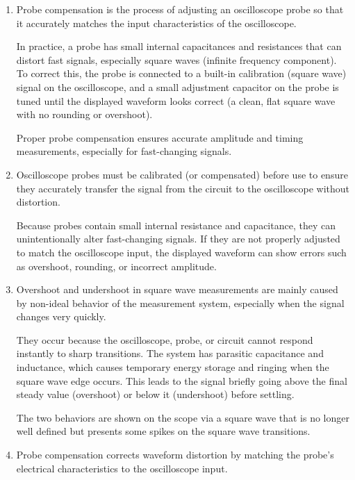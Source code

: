\documentclass[../main.tex]{subfiles}
\begin{document}
\begin{enumerate}[label=\textbf{\arabic*.}]
	This stability is essential for accurate waveform analysis because it allows you to clearly observe signal shape, timing, and amplitude. It also makes it possible to reliably measure features like period, frequency, and rise time without the display constantly shifting.

	\item Probe compensation is the process of adjusting an oscilloscope probe so that it accurately matches the input characteristics of the oscilloscope.

	In practice, a probe has small internal capacitances and resistances that can distort fast signals, especially square waves (infinite frequency component). To correct this, the probe is connected to a built-in calibration (square wave) signal on the oscilloscope, and a small adjustment capacitor on the probe is tuned until the displayed waveform looks correct (a clean, flat square wave with no rounding or overshoot).

	Proper probe compensation ensures accurate amplitude and timing measurements, especially for fast-changing signals.

	\item Oscilloscope probes must be calibrated (or compensated) before use to ensure they accurately transfer the signal from the circuit to the oscilloscope without distortion.

	Because probes contain small internal resistance and capacitance, they can unintentionally alter fast-changing signals. If they are not properly adjusted to match the oscilloscope input, the displayed waveform can show errors such as overshoot, rounding, or incorrect amplitude.
	
	\item Overshoot and undershoot in square wave measurements are mainly caused by non-ideal behavior of the measurement system, especially when the signal changes very quickly.

	They occur because the oscilloscope, probe, or circuit cannot respond instantly to sharp transitions. The system has parasitic capacitance and inductance, which causes temporary energy storage and ringing when the square wave edge occurs. This leads to the signal briefly going above the final steady value (overshoot) or below it (undershoot) before settling.

	The two behaviors are shown on the scope via a square wave that is no longer well defined but presents some spikes on the square wave transitions.

	\item Probe compensation corrects waveform distortion by matching the probe’s electrical characteristics to the oscilloscope input.


\end{enumerate}
\end{document}
